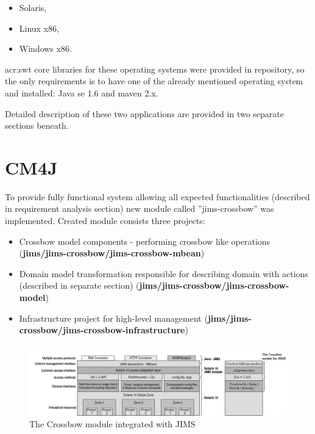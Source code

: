 \documentclass[11pt]{book}
\begin{document}
      \begin{itemize}
        \item Solaris,
        \item Linux x86,
        \item Windows x86.
      \end{itemize}

      \gls{acr:swt} core libraries for these operating systems were provided in repository, so the only requirements is to have
      one of the already mentioned operating system and installed: Java se 1.6 and maven 2.x.
	  
	  \medskip
	  
	  Detailed description of these two applications are provided in two separate sections beneath. 
	  
	  \section{CM4J}
		\label{sec:impl:module}
		
      To provide fully functional system allowing all expected functionalities (described in requirement analysis
      section) new module called ''jims-crossbow'' was implemented. Created module consists three projects:

			\begin{itemize}
				\item{Crossbow model components - performing crossbow like operations (\textbf{jims/jims-crossbow/jims-crossbow-mbean})}
				\item{Domain model transformation responsible for describing domain with actions 
					(described in separate section) (\textbf{jims/jims-crossbow/jims-crossbow-model})}
				\item{Infrastructure project for high-level management (\textbf{jims/jims-crossbow/jims-crossbow-infrastructure})}
			\end{itemize}

		      \begin{figure}[H]
        			\begin{center}
			          \includegraphics[width=1.26\textwidth, angle=90]{img/impl/jims_and_cm4j.png}
			\end{center}
		          \caption{The Crossbow module integrated with JIMS \cite{jims}}
		      \end{figure}
		
\end{document}
